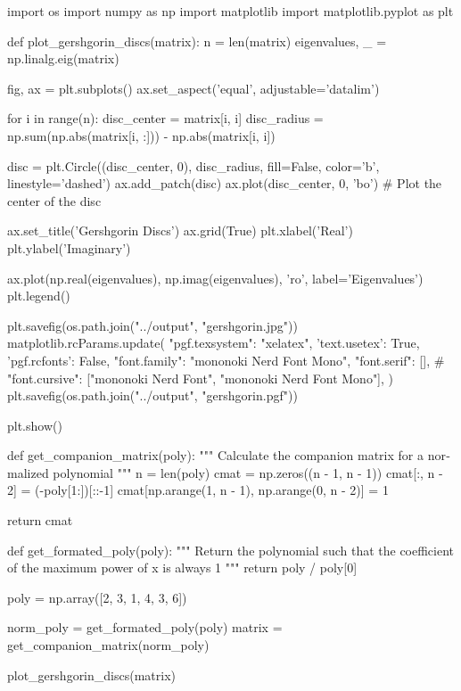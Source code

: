 \begin{latin}
  \begin{python}

import os
import numpy as np
import matplotlib
import matplotlib.pyplot as plt


def plot_gershgorin_discs(matrix):
    n = len(matrix)
    eigenvalues, _ = np.linalg.eig(matrix)

    fig, ax = plt.subplots()
    ax.set_aspect('equal', adjustable='datalim')

    for i in range(n):
        disc_center = matrix[i, i]
        disc_radius = np.sum(np.abs(matrix[i, :])) - np.abs(matrix[i, i])

        disc = plt.Circle((disc_center, 0), disc_radius, fill=False, color='b', linestyle='dashed')
        ax.add_patch(disc)
        ax.plot(disc_center, 0, 'bo')  # Plot the center of the disc

    ax.set_title('Gershgorin Discs')
    ax.grid(True)
    plt.xlabel('Real')
    plt.ylabel('Imaginary')

    ax.plot(np.real(eigenvalues), np.imag(eigenvalues), 'ro', label='Eigenvalues')
    plt.legend()

    plt.savefig(os.path.join("../output", "gershgorin.jpg"))
    matplotlib.rcParams.update({
        "pgf.texsystem": "xelatex",
        'text.usetex': True,
        'pgf.rcfonts': False,
        "font.family": "mononoki Nerd Font Mono",
        "font.serif": [],
        #  "font.cursive": ["mononoki Nerd Font", "mononoki Nerd Font Mono"],
    })
    plt.savefig(os.path.join("../output", "gershgorin.pgf"))

    plt.show()


def get_companion_matrix(poly):
    """
    Calculate the companion matrix for a normalized polynomial
    """
    n = len(poly)
    cmat = np.zeros((n - 1, n - 1))
    cmat[:, n - 2] = (-poly[1:])[::-1]
    cmat[np.arange(1, n - 1), np.arange(0, n - 2)] = 1

    return cmat


def get_formated_poly(poly):
    """
    Return the polynomial such that the coefficient of the maximum power of x
    is always 1
    """
    return poly / poly[0]


poly = np.array([2, 3, 1, 4, 3, 6])

norm_poly = get_formated_poly(poly)
matrix = get_companion_matrix(norm_poly)

plot_gershgorin_discs(matrix)

  \end{python}
\end{latin}


